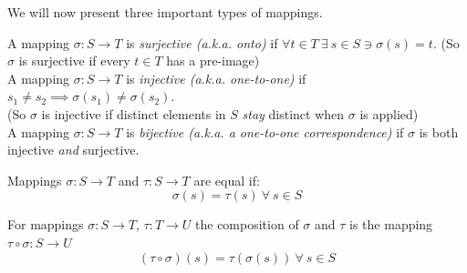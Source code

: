 \noindent We will now present three important types of mappings.

\begin{definition}
A mapping $\sigma: S\rightarrow T$ is \textit{surjective (a.k.a. onto)} if $\forall t\in T \ \exists \ s\in S \ni \sigma(s)=t$. (So $\sigma$ is surjective if every $t\in T$ has a pre-image)\steezybreak\\
A mapping $\sigma: S\rightarrow T$ is \textit{injective (a.k.a. one-to-one)} if $s_1\neq s_2 \implies \sigma(s_1)\neq \sigma(s_2)$. \\(So $\sigma$ is injective if distinct elements in $S$ \textit{stay} distinct when $\sigma$ is applied)\steezybreak\\
A mapping $\sigma: S\rightarrow T$ is \textit{bijective (a.k.a. a one-to-one correspondence)} if $\sigma$ is both injective \textit{and} surjective.
\end{definition}
\begin{definition}
Mappings $\sigma : S \rightarrow T$ and $\tau: S \rightarrow T$ are equal if:
\begin{equation}
    \sigma(s)=\tau(s) \ \forall \ s\in S\nonumber
\end{equation}
\end{definition}
\begin{definition}
For mappings $\sigma: S\rightarrow T$, $\tau: T\rightarrow U$ the composition of $\sigma$ and $\tau$ is the mapping $\tau \circ \sigma: S\rightarrow U$ 
\begin{equation}
    (\tau \circ \sigma)(s) = \tau(\sigma(s)) \ \forall \ s \in S \nonumber
\end{equation}
\end{definition}
